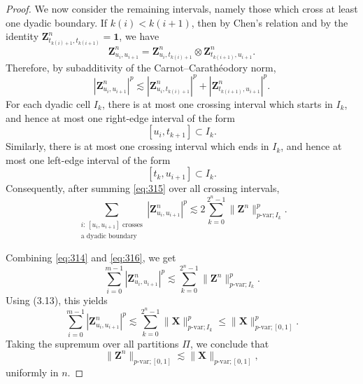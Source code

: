 \documentclass[12pt,a4paper]{article}
\numberwithin{equation}{section}
\theoremstyle{plain}
\theoremstyle{definition}
\theoremstyle{remark}
\begin{document}
\begin{proof}
We now consider the remaining intervals, namely those which cross at least one dyadic
boundary. If \(k(i)<k(i+1)\), then by Chen's relation and by the identity
\(\mathbf{Z}^n_{t_{k(i)+1},t_{k(i+1)}}=\mathbf 1\), we have
\[
\mathbf{Z}^n_{u_i,u_{i+1}}
=
\mathbf{Z}^n_{u_i,t_{k(i)+1}}
\otimes
\mathbf{Z}^n_{t_{k(i+1)},u_{i+1}} .
\]
Therefore, by subadditivity of the Carnot--Carath\'eodory norm,
\begin{equation} \label{eq:315}
|\mathbf{Z}^n_{u_i,u_{i+1}}|^p
\lesssim
|\mathbf{Z}^n_{u_i,t_{k(i)+1}}|^p
+
|\mathbf{Z}^n_{t_{k(i+1)},u_{i+1}}|^p .
\end{equation}
For each dyadic cell \(I_k\), there is at most one crossing interval which starts in
\(I_k\), and hence at most one right-edge interval of the form
\[
[u_i,t_{k+1}]\subset I_k.
\]
Similarly, there is at most one crossing interval which ends in \(I_k\), and hence at most
one left-edge interval of the form
\[
[t_k,u_{i+1}]\subset I_k.
\]
Consequently, after summing \eqref{eq:315} over all crossing intervals,
\begin{equation} \label{eq:316}
\sum_{\substack{i:\,[u_i,u_{i+1}]\text{ crosses}\\ \text{a dyadic boundary}}}
|\mathbf{Z}^n_{u_i,u_{i+1}}|^p
\lesssim
2\sum_{k=0}^{2^n-1}
\|\mathbf{Z}^n\|_{p\text{-var};I_k}^p .
\end{equation}

Combining \eqref{eq:314} and \eqref{eq:316}, we get
\begin{equation} \label{eq:pvar}
\sum_{i=0}^{m-1}
|\mathbf{Z}^n_{u_i,u_{i+1}}|^p
\lesssim
\sum_{k=0}^{2^n-1}
\|\mathbf{Z}^n\|_{p\text{-var};I_k}^p .
\end{equation}
Using (3.13), this yields
\[
\sum_{i=0}^{m-1}
|\mathbf{Z}^n_{u_i,u_{i+1}}|^p
\lesssim
\sum_{k=0}^{2^n-1}
\|\mathbf X\|_{p\text{-var};I_k}^p
\le
\|\mathbf X\|_{p\text{-var};[0,1]}^p .
\]
Taking the supremum over all partitions \(\Pi\), we conclude that
\[
\|\mathbf{Z}^n\|_{p\text{-var};[0,1]}
\lesssim
\|\mathbf X\|_{p\text{-var};[0,1]},
\]
uniformly in \(n\).
	

\end{proof}
\end{document}
